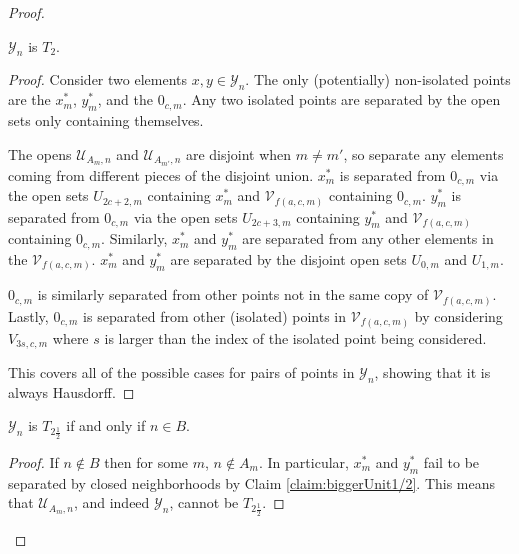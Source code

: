 \documentclass[11pt]{amsart}
\theoremstyle{remark}
\begin{document}
\begin{proof}
    \begin{claim}\label{claim:T2for1/2}
        $\mathcal{Y}_n$ is $T_2$.
    \end{claim}

    \begin{proof}
        Consider two elements $x,y\in\mathcal{Y}_n$.
        The only (potentially) non-isolated points are the $x^*_m$, $y^*_m$, and the $0_{c,m}$.
        Any two isolated points are separated by the open sets only containing themselves.

        The opens $\mathcal{U}_{A_m,n}$ and $\mathcal{U}_{A_{m'},n}$ are disjoint when $m\neq m'$, so separate any elements coming from different pieces of the disjoint union.
        $x^*_m$ is separated from $0_{c,m}$ via the open sets $U_{2c+2,m}$ containing $x^*_m$ and $\mathcal{V}_{f(a,c,m)}$ containing $0_{c,m}$.
        $y^*_m$ is separated from $0_{c,m}$ via the open sets $U_{2c+3,m}$ containing $y^*_m$ and $\mathcal{V}_{f(a,c,m)}$ containing $0_{c,m}$.
        Similarly, $x^*_m$ and $y^*_m$ are separated from any other elements in the $\mathcal{V}_{f(a,c,m)}$.
        $x^*_m$ and $y^*_m$ are separated by the disjoint open sets $U_{0,m}$ and $U_{1,m}$.

        $0_{c,m}$ is similarly separated from other points not in the same copy of $\mathcal{V}_{f(a,c,m)}$.
        Lastly, $0_{c,m}$ is separated from other (isolated) points in $\mathcal{V}_{f(a,c,m)}$ by considering $V_{3s,c,m}$ where $s$ is larger than the index of the isolated point being considered.

        This covers all of the possible cases for pairs of points in $\mathcal{Y}_n$, showing that it is always Hausdorff. 
    \end{proof}

    \begin{claim}\label{claim:T21/2Reduction}
        $\mathcal{Y}_n$ is $T_{2\frac12}$ if and only if $n\in B$.
    \end{claim}

    \begin{proof}
        If $n\not\in B$ then for some $m$, $n\not\in A_m$.
        In particular, $x^*_m$ and $y^*_m$ fail to be separated by closed neighborhoods by Claim \ref{claim:biggerUnit1/2}.
        This means that $\mathcal{U}_{A_m,n}$, and indeed $\mathcal{Y}_n$, cannot be $T_{2\frac12}$.


\end{proof}
\end{proof}
\end{document}
